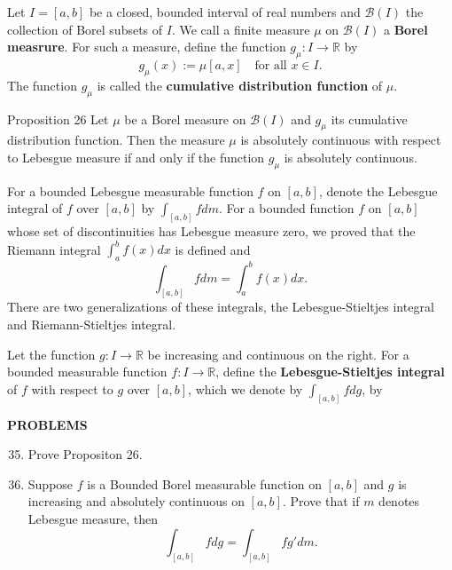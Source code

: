 Let $I=[a,b]$ be a closed, bounded interval of real numbers and $\mathcal{B}(I)$ the collection of Borel subsets of $I$.
We call a finite measure $\mu$ on $\mathcal{B}(I)$ a \textbf{Borel measrure}.
For such a measure, define the function $g_\mu:I\to\mathbb{R}$ by
\[
    g_\mu(x):=\mu[a,x]\quad\text{for all }x\in I.
\]
The function $g_\mu$ is called the \textbf{cumulative distribution function} of $\mu$.

\begin{namedthm*}{Proposition 26}
    Let $\mu$ be a Borel measure on $\mathcal{B}(I)$ and $g_\mu$ its cumulative distribution function.
    Then the measure $\mu$ is absolutely continuous with respect to Lebesgue measure if and only if the function $g_\mu$ is absolutely continuous.
\end{namedthm*}

For a bounded Lebesgue measurable function $f$ on $[a,b]$, denote the Lebesgue integral of $f$ over $[a,b]$ by $\int_{[a,b]}fdm$.
For a bounded function $f$ on $[a,b]$ whose set of discontinuities has Lebesgue measure zero, we proved that the Riemann integral $\int_a^bf(x)dx$ is defined and 
\[
    \int_{[a,b]}fdm=\int_a^bf(x)dx.
\]
There are two generalizations of these integrals, the Lebesgue-Stieltjes integral and Riemann-Stieltjes integral.

Let the function $g:I\to\mathbb{R}$ be increasing and continuous on the right.
For a bounded measurable function $f:I\to\mathbb{R}$, define the \textbf{Lebesgue-Stieltjes integral} of $f$ with respect to $g$ over $[a,b]$, which we denote by $\int_{[a,b]}fdg$, by

\begin{center}
	\textbf{PROBLEMS}
\end{center}
\begin{enumerate}
	\setcounter{enumi}{34}
    \item Prove Propositon 26.
    \item Suppose $f$ is a Bounded Borel measurable function on $[a,b]$ and $g$ is increasing and absolutely continuous on $[a,b]$.
    Prove that if $m$ denotes Lebesgue measure, then 
    \[
        \int_{[a,b]}fdg=\int_{[a,b]}fg'dm.
    \]

\end{enumerate}

